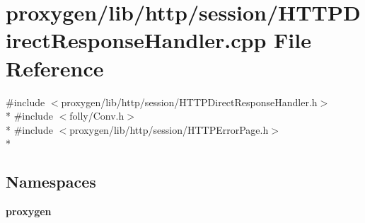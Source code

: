 \section{proxygen/lib/http/session/\+H\+T\+T\+P\+Direct\+Response\+Handler.cpp File Reference}
\label{HTTPDirectResponseHandler_8cpp}
{\ttfamily \#include $<$proxygen/lib/http/session/\+H\+T\+T\+P\+Direct\+Response\+Handler.\+h$>$}\\*
{\ttfamily \#include $<$folly/\+Conv.\+h$>$}\\*
{\ttfamily \#include $<$proxygen/lib/http/session/\+H\+T\+T\+P\+Error\+Page.\+h$>$}\\*
\subsection*{Namespaces}
\begin{DoxyCompactItemize}
\item 
 {\bf proxygen}
\end{DoxyCompactItemize}
